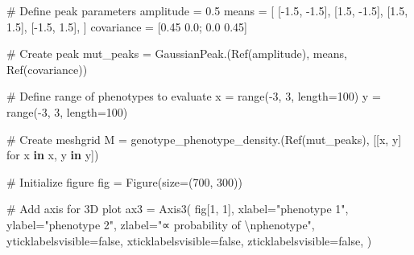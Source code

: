 \documentclass[
]{scrartcl}
\newenvironment{Shaded}{\begin{snugshade}}{\end{snugshade}}
\newcommand{\CommentTok}[1]{\textcolor[rgb]{0.37,0.37,0.37}{#1}}
\newcommand{\ConstantTok}[1]{\textcolor[rgb]{0.56,0.35,0.01}{#1}}
\newcommand{\FloatTok}[1]{\textcolor[rgb]{0.68,0.00,0.00}{#1}}
\newcommand{\FunctionTok}[1]{\textcolor[rgb]{0.28,0.35,0.67}{#1}}
\newcommand{\KeywordTok}[1]{\textcolor[rgb]{0.00,0.23,0.31}{\textbf{#1}}}
\newcommand{\NormalTok}[1]{\textcolor[rgb]{0.00,0.23,0.31}{#1}}
\newcommand{\OperatorTok}[1]{\textcolor[rgb]{0.37,0.37,0.37}{#1}}
\newcommand{\SpecialCharTok}[1]{\textcolor[rgb]{0.37,0.37,0.37}{#1}}
\newcommand{\StringTok}[1]{\textcolor[rgb]{0.13,0.47,0.30}{#1}}
\begin{document}
\begin{Shaded}
\begin{Highlighting}[]
\CommentTok{\# Define peak parameters}
\NormalTok{amplitude }\OperatorTok{=} \FloatTok{0.5}
\NormalTok{means }\OperatorTok{=}\NormalTok{ [}
\NormalTok{    [}\OperatorTok{{-}}\FloatTok{1.5}\NormalTok{, }\OperatorTok{{-}}\FloatTok{1.5}\NormalTok{],}
\NormalTok{    [}\FloatTok{1.5}\NormalTok{, }\OperatorTok{{-}}\FloatTok{1.5}\NormalTok{],}
\NormalTok{    [}\FloatTok{1.5}\NormalTok{, }\FloatTok{1.5}\NormalTok{],}
\NormalTok{    [}\OperatorTok{{-}}\FloatTok{1.5}\NormalTok{, }\FloatTok{1.5}\NormalTok{],}
\NormalTok{]}
\NormalTok{covariance }\OperatorTok{=}\NormalTok{ [}\FloatTok{0.45} \FloatTok{0.0}\NormalTok{; }\FloatTok{0.0} \FloatTok{0.45}\NormalTok{]}

\CommentTok{\# Create peak}
\NormalTok{mut\_peaks }\OperatorTok{=} \FunctionTok{GaussianPeak}\NormalTok{.(}\FunctionTok{Ref}\NormalTok{(amplitude), means, }\FunctionTok{Ref}\NormalTok{(covariance))}

\CommentTok{\# Define range of phenotypes to evaluate}
\NormalTok{x }\OperatorTok{=} \FunctionTok{range}\NormalTok{(}\OperatorTok{{-}}\FloatTok{3}\NormalTok{, }\FloatTok{3}\NormalTok{, length}\OperatorTok{=}\FloatTok{100}\NormalTok{)}
\NormalTok{y }\OperatorTok{=} \FunctionTok{range}\NormalTok{(}\OperatorTok{{-}}\FloatTok{3}\NormalTok{, }\FloatTok{3}\NormalTok{, length}\OperatorTok{=}\FloatTok{100}\NormalTok{)}

\CommentTok{\# Create meshgrid}
\NormalTok{M }\OperatorTok{=} \FunctionTok{genotype\_phenotype\_density}\NormalTok{.(}\FunctionTok{Ref}\NormalTok{(mut\_peaks), [[x, y] for x }\KeywordTok{in}\NormalTok{ x, y }\KeywordTok{in}\NormalTok{ y])}

\CommentTok{\# Initialize figure}
\NormalTok{fig }\OperatorTok{=} \FunctionTok{Figure}\NormalTok{(size}\OperatorTok{=}\NormalTok{(}\FloatTok{700}\NormalTok{, }\FloatTok{300}\NormalTok{))}

\CommentTok{\# Add axis for 3D plot}
\NormalTok{ax3 }\OperatorTok{=} \FunctionTok{Axis3}\NormalTok{(}
\NormalTok{    fig[}\FloatTok{1}\NormalTok{, }\FloatTok{1}\NormalTok{],}
\NormalTok{    xlabel}\OperatorTok{=}\StringTok{"phenotype 1"}\NormalTok{,}
\NormalTok{    ylabel}\OperatorTok{=}\StringTok{"phenotype 2"}\NormalTok{,}
\NormalTok{    zlabel}\OperatorTok{=}\StringTok{"∝ probability of }\SpecialCharTok{\textbackslash{}n}\StringTok{phenotype"}\NormalTok{,}
\NormalTok{    yticklabelsvisible}\OperatorTok{=}\ConstantTok{false}\NormalTok{,}
\NormalTok{    xticklabelsvisible}\OperatorTok{=}\ConstantTok{false}\NormalTok{,}
\NormalTok{    zticklabelsvisible}\OperatorTok{=}\ConstantTok{false}\NormalTok{,}
\NormalTok{)}


\end{Highlighting}
\end{Shaded}
\end{document}
